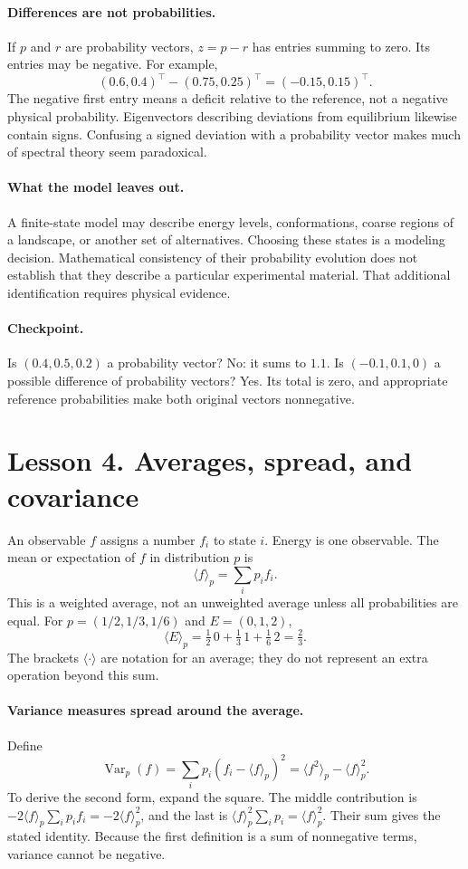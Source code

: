 \documentclass[11pt]{article}
\newcommand{\Var}{\operatorname{Var}}
\begin{document}
\paragraph{Differences are not probabilities.}
If $p$ and $r$ are probability vectors, $z=p-r$ has entries summing to zero.
Its entries may be negative. For example,
\[
(0.6,0.4)^\top-(0.75,0.25)^\top=(-0.15,0.15)^\top.
\]
The negative first entry means a deficit relative to the reference, not a
negative physical probability. Eigenvectors describing deviations from
equilibrium likewise contain signs. Confusing a signed deviation with a
probability vector makes much of spectral theory seem paradoxical.

\paragraph{What the model leaves out.}
A finite-state model may describe energy levels, conformations, coarse regions
of a landscape, or another set of alternatives. Choosing these states is a
modeling decision. Mathematical consistency of their probability evolution
does not establish that they describe a particular experimental material.
That additional identification requires physical evidence.

\paragraph{Checkpoint.}
Is $(0.4,0.5,0.2)$ a probability vector? No: it sums to $1.1$. Is
$(-0.1,0.1,0)$ a possible difference of probability vectors? Yes. Its total is
zero, and appropriate reference probabilities make both original vectors
nonnegative.

\clearpage
\section*{Lesson 4. Averages, spread, and covariance}
An observable $f$ assigns a number $f_i$ to state $i$. Energy is one observable.
The mean or expectation of $f$ in distribution $p$ is
\[
\langle f\rangle_p=\sum_i p_i f_i.
\]
This is a weighted average, not an unweighted average unless all probabilities
are equal. For $p=(1/2,1/3,1/6)$ and $E=(0,1,2)$,
\[
\langle E\rangle_p=\tfrac12\,0+\tfrac13\,1+\tfrac16\,2=\tfrac23.
\]
The brackets $\langle\cdot\rangle$ are notation for an average; they do not
represent an extra operation beyond this sum.

\paragraph{Variance measures spread around the average.}
Define
\[
\Var_p(f)=\sum_i p_i(f_i-\langle f\rangle_p)^2
=\langle f^2\rangle_p-\langle f\rangle_p^2.
\]
To derive the second form, expand the square. The middle contribution is
$-2\langle f\rangle_p\sum_i p_i f_i=-2\langle f\rangle_p^2$, and the last
is $\langle f\rangle_p^2\sum_i p_i=\langle f\rangle_p^2$. Their sum gives
the stated identity. Because the first definition is a sum of nonnegative
terms, variance cannot be negative.
\end{document}

